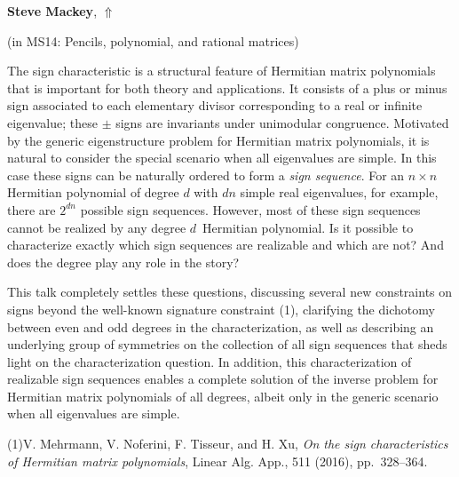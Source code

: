 \documentclass[ILAS2025-program.tex]{subfiles}
\begin{document}
     \hypertarget{down0214}{}\begin{ilasabstract}
    
    \textbf{Steve Mackey},  \hfill \hyperlink{up0214}{$\Uparrow$}
    
    (in {\color{mstitle}MS14: Pencils, polynomial, and rational matrices})
        
        \mtskip
    The sign characteristic is a structural feature of Hermitian matrix polynomials
that is important for both theory and applications. 
It consists of a plus or minus sign associated to each elementary divisor
corresponding to a real or infinite eigenvalue;
these $\pm$ signs are invariants under unimodular congruence.
Motivated by the generic eigenstructure problem
for Hermitian matrix polynomials,
it is natural to consider the special scenario 
when all eigenvalues are simple.
In this case these signs can be naturally ordered to form a \emph{sign sequence}. 
 For an $n \times n$ Hermitian polynomial of degree $d$
with $dn$ simple real eigenvalues, for example, 
there are $2^{dn}$ possible sign sequences.
However, most of these sign sequences 
cannot be realized by any degree $d$ \,Hermitian polynomial. 
Is it possible to characterize exactly which sign sequences 
are realizable and which are not? 
And does the degree play any role in the story?

This talk completely settles these questions, 
discussing several new constraints on signs 
beyond the well-known signature constraint (1),
clarifying the dichotomy between even and odd degrees 
in the characterization,
as well as describing an underlying group of symmetries 
on the collection of all sign sequences 
that sheds light on the characterization question. 
In addition,
this characterization of realizable sign sequences enables a complete solution 
of the inverse problem for Hermitian matrix polynomials of all degrees, 
albeit only in the generic scenario when all eigenvalues are simple.

\noindent 
(1){V. Mehrmann, V. Noferini, F. Tisseur, and H. Xu},
 {\em On the sign characteristics of Hermitian matrix polynomials}, 
    Linear Alg. App., 511 (2016), pp.~328--364.
\end{ilasabstract}
\end{document}
